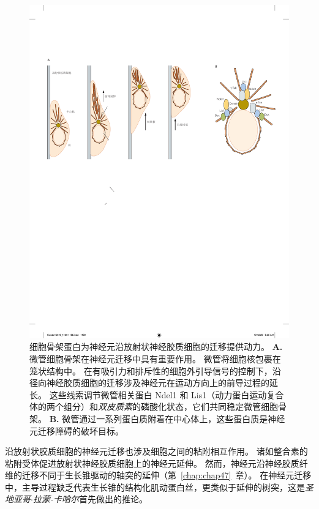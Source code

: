 \begin{figure}[htbp]
	\centering
	\includegraphics[width=1.0\linewidth]{chap46/fig_46_7}
	\caption{细胞骨架蛋白为神经元沿放射状神经胶质细胞的迁移提供动力。
		\textbf{A.} 微管细胞骨架在神经元迁移中具有重要作用。
		微管将细胞核包裹在笼状结构中。
		在有吸引力和排斥性的细胞外引导信号的控制下，沿径向神经胶质细胞的迁移涉及神经元在运动方向上的前导过程的延长。
		这些线索调节微管相关蛋白 Ndel1 和 Lis1（动力蛋白运动复合体的两个组分）和\textit{双皮质素}的磷酸化状态，它们共同稳定微管细胞骨架\cite{gleeson2000neuronal}。
		\textbf{B.} 微管通过一系列蛋白质附着在中心体上，这些蛋白质是神经元迁移障碍的破坏目标。}
	\label{fig:46_7}
\end{figure}


沿放射状胶质细胞的神经元迁移也涉及细胞之间的粘附相互作用。
诸如整合素的粘附受体促进放射状神经胶质细胞上的神经元延伸。
然而，神经元沿神经胶质纤维的迁移不同于生长锥驱动的轴突的延伸（第~\ref{chap:chap47}~章）。
在神经元迁移中，主导过程缺乏代表生长锥的结构化肌动蛋白丝，更类似于延伸的树突，这是\textit{圣地亚哥$\cdot$拉蒙-卡哈尔}首先做出的推论。


